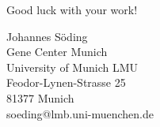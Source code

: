 \documentclass[11pt,a4paper]{article}
\begin{document}
\vspace{20mm}
\begin{center}
Good luck with your work!

\vspace{5mm}
Johannes S\"oding\\[2mm]
Gene Center Munich\\
University of Munich {LMU}\\
Feodor-Lynen-Strasse 25\\
81377 Munich\\
soeding@lmb.uni-muenchen.de\\
\end{center}
\end{document}
